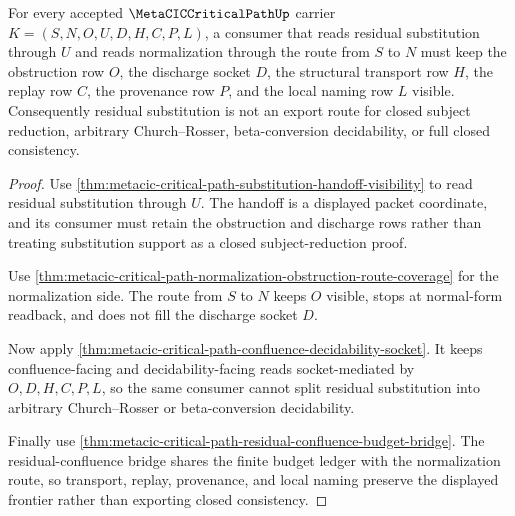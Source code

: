 \begin{theorem}
\label{thm:metacic-critical-path-residual-substitution-normalization-frontier}
For every accepted $\MetaCICCriticalPathUp$ carrier $K=(S,N,O,U,D,H,C,P,L)$, a consumer that reads residual substitution through $U$ and reads normalization through the route from $S$ to $N$ must keep the obstruction row $O$, the discharge socket $D$, the structural transport row $H$, the replay row $C$, the provenance row $P$, and the local naming row $L$ visible. Consequently residual substitution is not an export route for closed subject reduction, arbitrary Church--Rosser, beta-conversion decidability, or full closed consistency.
\end{theorem}
\begin{proof}
Use \autoref{thm:metacic-critical-path-substitution-handoff-visibility} to read residual substitution through $U$. The handoff is a displayed packet coordinate, and its consumer must retain the obstruction and discharge rows rather than treating substitution support as a closed subject-reduction proof.

Use \autoref{thm:metacic-critical-path-normalization-obstruction-route-coverage} for the normalization side. The route from $S$ to $N$ keeps $O$ visible, stops at normal-form readback, and does not fill the discharge socket $D$.

Now apply \autoref{thm:metacic-critical-path-confluence-decidability-socket}. It keeps confluence-facing and decidability-facing reads socket-mediated by $O,D,H,C,P,L$, so the same consumer cannot split residual substitution into arbitrary Church--Rosser or beta-conversion decidability.

Finally use \autoref{thm:metacic-critical-path-residual-confluence-budget-bridge}. The residual-confluence bridge shares the finite budget ledger with the normalization route, so transport, replay, provenance, and local naming preserve the displayed frontier rather than exporting closed consistency.
\end{proof}

